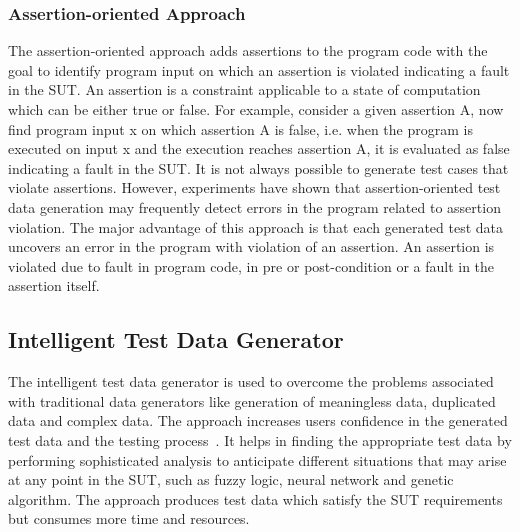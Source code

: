 \subsubsection{Assertion-oriented Approach}
The assertion-oriented approach adds assertions to the program code with the goal to identify program input on which an assertion is violated indicating a fault in the SUT. An assertion is a constraint applicable to a state of computation which can be either true or false. For example, consider a given assertion A, now find program input x on which assertion A is false, i.e. when the program is executed on input x and the execution reaches assertion A, it is evaluated as false indicating a fault in the SUT. It is not always possible to generate test cases that violate assertions. However, experiments have shown that assertion-oriented test data generation may frequently detect errors in the program related to assertion violation. The major advantage of this approach is that each generated test data uncovers an error in the program with violation of an assertion. An assertion is violated due to fault in program code, in pre or post-condition or a fault in the assertion itself.



\subsection{Intelligent Test Data Generator}
\label{sec:intelligent_2}
The intelligent test data generator is used to overcome the problems associated with traditional data generators like generation of meaningless data, duplicated data and complex data. The approach increases users confidence in the generated test data and the testing process~\cite{ramamoorthy1975testing}. It helps in finding the appropriate test data by performing sophisticated analysis to anticipate different situations that may arise at any point in the SUT, such as fuzzy logic, neural network and genetic algorithm. The approach produces test data which satisfy the SUT requirements but consumes more time and resources.

